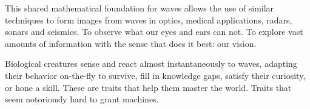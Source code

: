 This shared mathematical foundation for waves allows the use of similar techniques to form images from waves in optics, medical applications, radars, sonars and seismics. To observe what our eyes and ears can not. To explore vast amounts of information with the sense that does it best: our vision.

Biological creatures sense and react almost instantaneously to waves, adapting their behavior on-the-fly to survive, fill in knowledge gaps, satisfy their curiosity, or hone a skill. These are traits that help them master the world. Traits that seem notoriously hard to grant machines.


%          


\IncludeWritingTipstrue
\newcommand\tip[1]{\ifIncludeWritingTips{}#1\fi}










